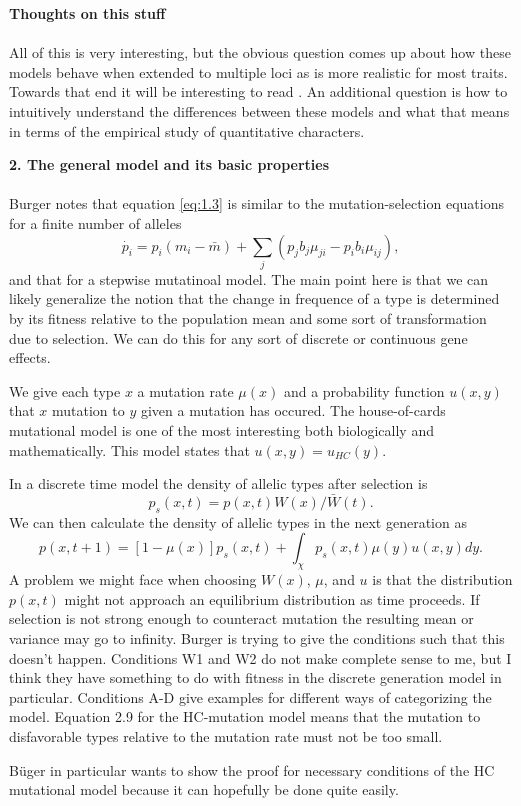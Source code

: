 \textbf{Thoughts on this stuff}\\ \\
All of this is very interesting, but the obvious question comes up about how these models behave when extended to
multiple loci as is more realistic for most traits. Towards that end it will be interesting to read \citet{Lande2007}.
An additional question is how to intuitively understand the differences between these models and what that means in terms 
of the empirical study of quantitative characters. 

\textbf{2. The general model and its basic properties}\\ \\
Burger notes that equation \ref{eq:1.3} is similar to the mutation-selection equations for a finite number of alleles
\begin{equation}
\dot{p_i}=p_i(m_i-\bar{m}) + \sum_j\left( p_jb_j\mu_{ji}-p_ib_i\mu_{ij}\right),
\end{equation}
and that for a stepwise mutatinoal model. The main point here is that we can likely generalize the notion that the
change in frequence of a type is determined by its fitness relative to the population mean and some sort of
transformation due to selection. We can do this for any sort of discrete or continuous gene effects.

We give each type $x$ a mutation rate $\mu(x)$ and a probability function $u(x,y)$ that $x$ mutation to $y$ given a
mutation has occured. The house-of-cards mutational model is one of the most interesting both biologically and
mathematically. This model states that $u(x,y)=u_{HC}(y)$. 

In a discrete time model the density of allelic types after selection is 
\begin{equation}
p_s(x,t) = p(x,t)W(x)/\bar{W}(t).
\end{equation}
We can then calculate the density of allelic types in the next generation as
\begin{equation}
p(x,t+1) = \left[1-\mu(x)\right]p_s(x,t) + \int_{\chi}p_s(x,t)\mu(y)u(x,y)dy.
\end{equation}
A problem we might face when choosing $W(x)$, $\mu$, and $u$ is that the distribution $p(x,t)$ might not approach an
equilibrium distribution as time proceeds. If selection is not strong enough to counteract mutation the resulting mean
or variance may go to infinity. Burger is trying to give the conditions such that this doesn't happen. Conditions W1 and
W2 do not make complete sense to me, but I think they have something to do with fitness in the discrete generation model
in particular. Conditions A-D give examples for different ways of categorizing the model. Equation 2.9 for the
HC-mutation model means that the mutation to disfavorable types relative to the mutation rate must not be too small.

B{\"u}ger in particular wants to show the proof for necessary conditions of the HC mutational model because it can
hopefully be done quite easily. 
